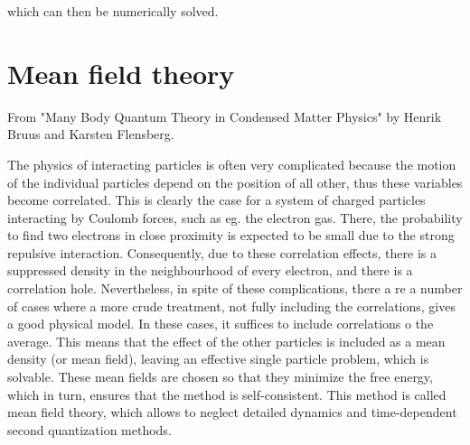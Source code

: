 \documentclass{homework}
\begin{document}
which can then be numerically solved. 

\clearpage 




    

%

\section{Mean field theory}

From "Many Body Quantum Theory in Condensed Matter Physics" by Henrik Bruus and Karsten Flensberg. 

The physics of interacting particles is often very complicated because the motion of the individual particles depend on the position of all other, thus these variables become correlated. This is clearly the case for a system of charged particles interacting by Coulomb forces, such as eg. the electron gas. There, the probability to find two electrons in close proximity is expected to be small due to the strong repulsive interaction. Consequently, due to these correlation effects, there is a suppressed density in the neighbourhood of every electron, and there is a correlation hole. 
Nevertheless, in spite of these complications, there a re a number of cases where a more crude treatment, not fully including the correlations, gives a good physical model. In these cases, it suffices to include correlations o the average. This means that the effect of the other particles is included as a mean density (or mean field), leaving an effective single particle problem, which is solvable. These mean fields are chosen so that they minimize the free energy, which in turn, ensures that the method is self-consistent. This method is called mean field theory, which allows to neglect detailed dynamics and time-dependent second quantization methods. \\
\end{document}
